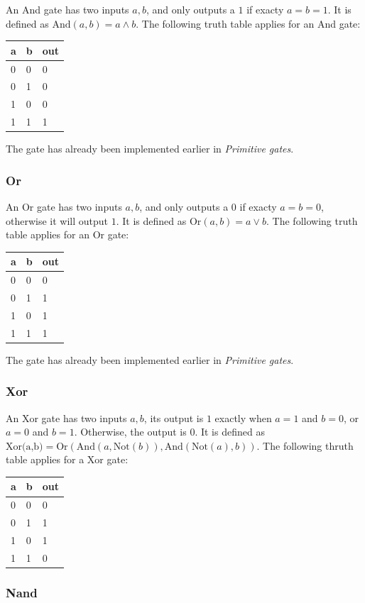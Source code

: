 \documentclass[11pt]{article}
\begin{document}
An And gate has two inputs \(a, b\), and only outputs a \(1\) if exacty
\(a=b=1\). It is defined as \(\text{And}(a,b)=a \land b\). The following
truth table applies for an And gate:

\begin{longtable}[]{@{}lll@{}}
\toprule
a & b & out\tabularnewline
\midrule
\endhead
0 & 0 & 0\tabularnewline
0 & 1 & 0\tabularnewline
1 & 0 & 0\tabularnewline
1 & 1 & 1\tabularnewline
\bottomrule
\end{longtable}

The gate has already been implemented earlier in \emph{Primitive gates}.

\hypertarget{or}{%
\subsubsection{Or}\label{or}}

An Or gate has two inputs \(a, b\), and only outputs a \(0\) if exacty
\(a=b=0\), otherwise it will output \(1\). It is defined as
\(\text{Or}(a,b)=a \lor b\). The following truth table applies for an Or
gate:

\begin{longtable}[]{@{}lll@{}}
\toprule
a & b & out\tabularnewline
\midrule
\endhead
0 & 0 & 0\tabularnewline
0 & 1 & 1\tabularnewline
1 & 0 & 1\tabularnewline
1 & 1 & 1\tabularnewline
\bottomrule
\end{longtable}

The gate has already been implemented earlier in \emph{Primitive gates}.

\hypertarget{xor}{%
\subsubsection{Xor}\label{xor}}

An Xor gate has two inputs \(a,b\), its output is \(1\) exactly when
\(a=1\) and \(b=0\), or \(a=0\) and \(b=1\). Otherwise, the output is
\(0\). It is defined as
\(\text{Xor(a,b)}=\text{Or}(\text{And}(a,\text{Not}(b)), \text{And}(\text{Not}(a),b))\).
The following thruth table applies for a Xor gate:

\begin{longtable}[]{@{}lll@{}}
\toprule
a & b & out\tabularnewline
\midrule
\endhead
0 & 0 & 0\tabularnewline
0 & 1 & 1\tabularnewline
1 & 0 & 1\tabularnewline
1 & 1 & 0\tabularnewline
\bottomrule
\end{longtable}

\hypertarget{nand}{%
\subsubsection{Nand}\label{nand}}
\end{document}
